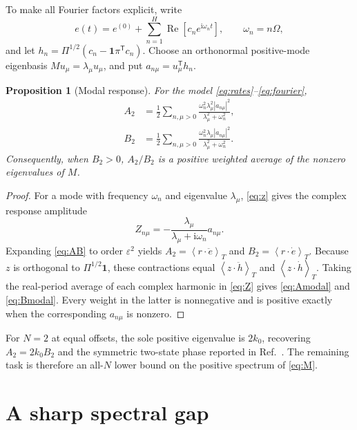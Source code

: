 \documentclass[11pt]{article}
\newtheorem{proposition}[theorem]{Proposition}
\newcommand{\one}{\bm{1}}
\newcommand{\avg}[1]{\left\langle #1\right\rangle_T}
\begin{document}
To make all Fourier factors explicit, write
\begin{equation}
 e(t)=e^{(0)}+\sum_{n=1}^{H}\operatorname{Re}
       \left[c_n e^{\mathrm i\omega_nt}\right],
 \qquad \omega_n=n\Omega,                                   \label{eq:fourier}
\end{equation}
and let $h_n=\Pi^{1/2}(c_n-\one\pi^{\mathsf T}c_n)$.  Choose an
orthonormal positive-mode eigenbasis $Mu_\mu=\lambda_\mu u_\mu$, and put
$a_{n\mu}=u_\mu^{\mathsf T}h_n$.

\begin{proposition}[Modal response]
For the model \eqref{eq:rates}--\eqref{eq:fourier},
\begin{align}
 A_2&=\frac12\sum_{n,\mu>0}
 \frac{\omega_n^2\lambda_\mu^2|a_{n\mu}|^2}
      {\lambda_\mu^2+\omega_n^2},                           \label{eq:Amodal}\\
 B_2&=\frac12\sum_{n,\mu>0}
 \frac{\omega_n^2\lambda_\mu|a_{n\mu}|^2}
      {\lambda_\mu^2+\omega_n^2}.                           \label{eq:Bmodal}
\end{align}
Consequently, when $B_2>0$, $A_2/B_2$ is a positive weighted average of the
nonzero eigenvalues of $M$.
\end{proposition}

\begin{proof}
For a mode with frequency $\omega_n$ and eigenvalue $\lambda_\mu$,
\eqref{eq:z} gives the complex response amplitude
\begin{equation}
 Z_{n\mu}=-\frac{\lambda_\mu}{\lambda_\mu+\mathrm i\omega_n}
 a_{n\mu}.                                                   \label{eq:Z}
\end{equation}
Expanding \eqref{eq:AB} to order $\varepsilon^2$ yields
$A_2=\avg{r\cdot\ddot e}$ and $B_2=\avg{r\cdot\dot e}$.
Because $z$ is orthogonal to $\Pi^{1/2}\one$, these contractions equal
$\avg{z\cdot\ddot h}$ and $\avg{z\cdot\dot h}$.  Taking the real-period
average of each complex harmonic in \eqref{eq:Z} gives
\eqref{eq:Amodal} and \eqref{eq:Bmodal}.  Every weight in the latter is
nonnegative and is positive exactly when the corresponding $a_{n\mu}$ is nonzero.
\end{proof}

For $N=2$ at equal offsets, the sole positive eigenvalue is $2k_0$, recovering
$A_2=2k_0B_2$ and the symmetric two-state phase reported in
Ref.~\cite{Deguenther2022}.  The remaining task is therefore an all-$N$ lower bound
on the positive spectrum of \eqref{eq:M}.

\section{A sharp spectral gap}                              \label{sec:gap}
\end{document}
